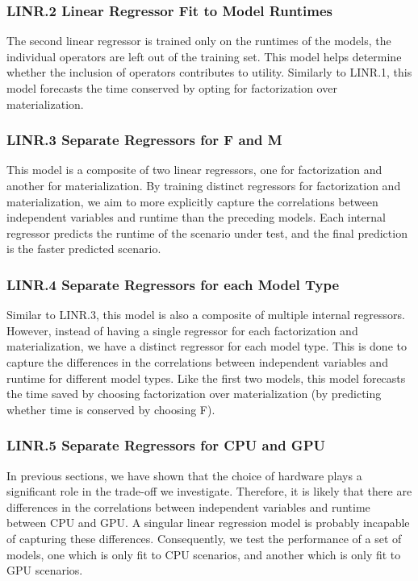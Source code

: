 \subsubsection*{LINR.2 Linear Regressor Fit to Model Runtimes}
The second linear regressor is trained only on the runtimes of the models, the individual operators are left out of the training set. This model helps determine whether the inclusion of operators contributes to utility. Similarly to LINR.1, this model forecasts the time conserved by opting for factorization over materialization.

\subsubsection*{LINR.3 Separate Regressors for F and M}
This model is a composite of two linear regressors, one for factorization and another for materialization. By training distinct regressors for factorization and materialization, we aim to more explicitly capture the correlations between independent variables and runtime than the preceding models. Each internal regressor predicts the runtime of the scenario under test, and the final prediction is the faster predicted scenario.

\subsubsection*{LINR.4 Separate Regressors for each Model Type}
Similar to LINR.3, this model is also a composite of multiple internal regressors. However, instead of having a single regressor for each factorization and materialization, we have a distinct regressor for each model type. This is done to capture the differences in the correlations between independent variables and runtime for different model types. Like the first two models, this model forecasts the time saved by choosing factorization over materialization (by predicting whether time is conserved by choosing F).

\subsubsection*{LINR.5 Separate Regressors for CPU and GPU}
In previous sections, we have shown that the choice of hardware plays a significant role in the trade-off we investigate. Therefore, it is likely that there are differences in the correlations between independent variables and runtime between CPU and GPU. A singular linear regression model is probably incapable of capturing these differences. Consequently, we test the performance of a set of models, one which is only fit to CPU scenarios, and another which is only fit to GPU scenarios.

